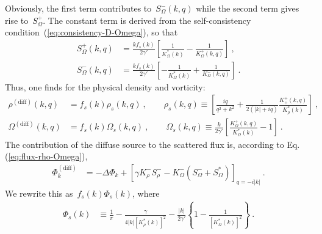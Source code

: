 \documentclass[preprint,aps,eqsecnum, prb]{revtex4-1}
\newcommand{\fplus}[1]{{#1}^{+}}
\newcommand{\fminus}[1]{{#1}^{-}}
\begin{document}
Obviously, the first term contributes to~$\fminus{S}_\Omega(k, q)$
while the second term gives rise to~$\fplus{S}_\Omega$. The constant
term is derived from the self-consistency
condition~(\ref{eq:consistency-D-Omega}), so that
\begin{align}
  \fplus{S}_\Omega(k, q) &= \frac{k f_s(k)}{2\gamma'}
  \left[\frac{1}{K^\ast_\Omega(k)} - \frac{1}{\fplus{K}_\Omega(k, q)}
  \right] \ , \\\nonumber
  \fminus{S}_\Omega(k, q) &= \frac{k f_s(k)}{2\gamma'}
  \left[-\frac{1}{K^\ast_\Omega(k)} + \frac{1}{\fminus{K}_\Omega(k, q)}
  \right] \ .
\end{align}
Thus, one finds for the physical density and vorticity:
\begin{align}
  \label{eq:rho-s}
  \rho^\mathrm{(diff)}(k, q) &= f_s(k) \rho_s(k, q)\ ,
                               \qquad \rho_s(k, q) \equiv
  \left[\frac{iq}{q^2 + k^2} + \frac{1}{2(|k| + iq)}
   \frac{\fplus{K}_{+}(k, q)}{K_\rho^\ast(k)}
  \right]
  \ , \\
  \label{eq:omega-s}
  \Omega^\mathrm{(diff)}(k, q) &= f_s(k) \Omega_s(k, q)\ , \qquad
                  \Omega_s(k, q) \equiv \frac{k}{2\gamma'} \left[
  \frac{\fplus{K}_\Omega(k, q)}{K_\Omega^\ast(k)} - 1
  \right]\ .
\end{align}
The contribution of the diffuse source to
the scattered flux is, according to Eq.(\ref{eq:flux-rho-Omega}),
\begin{align}
  \label{eq:phi-diff}
  \Phi^\mathrm{(diff)}_k &= -\Delta\Phi_{k} +
  \left[\gamma \fminus{K}_\rho \fminus{S}_\rho
  - \fminus{K}_\Omega \left(\fminus{S}_\Omega
                           + S_\Omega^\ast\right)\right]_{q = -i |k|}\ .
\end{align}
We rewrite this as~$f_s(k) \Phi_s(k)$, where
\begin{align}
  \Phi_s(k) &\equiv 
                       \frac{1}{\pi}
   - \frac{\gamma}{4|k| \left[K_\rho^\ast(k)\right]^2}
                - \frac{|k|}{2\gamma'}
                 \left\{1 - \frac{1}{\left[K_\Omega^\ast(k)\right]^2} \right\}
   \nonumber
  \ .
\end{align}
\end{document}
